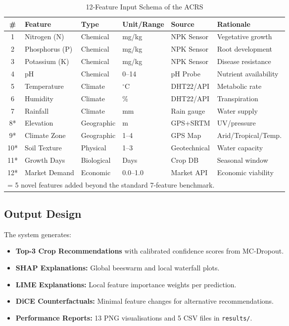 \documentclass[12pt,a4paper,oneside]{report}
\begin{document}
\begin{table}[H]
\centering
\caption{12-Feature Input Schema of the ACRS}
\label{tab:inputdesign}
\renewcommand{\arraystretch}{1.3}
\begin{tabular}{c p{2.5cm} p{1.8cm} p{2.0cm} p{2.2cm} p{2.8cm}}
\toprule
\textbf{\#} & \textbf{Feature} & \textbf{Type} & \textbf{Unit/Range} & \textbf{Source} & \textbf{Rationale} \\
\midrule
1 & Nitrogen (N) & Chemical & mg/kg & NPK Sensor & Vegetative growth \\
2 & Phosphorus (P) & Chemical & mg/kg & NPK Sensor & Root development \\
3 & Potassium (K) & Chemical & mg/kg & NPK Sensor & Disease resistance \\
4 & pH & Chemical & 0--14 & pH Probe & Nutrient availability \\
5 & Temperature & Climate & $^{\circ}$C & DHT22/API & Metabolic rate \\
6 & Humidity & Climate & \% & DHT22/API & Transpiration \\
7 & Rainfall & Climate & mm & Rain gauge & Water supply \\
8* & Elevation & Geographic & m & GPS+SRTM & UV/pressure \\
9* & Climate Zone & Geographic & 1--4 & GPS Map & Arid/Tropical/Temp. \\
10* & Soil Texture & Physical & 1--3 & Geotechnical & Water capacity \\
11* & Growth Days & Biological & Days & Crop DB & Seasonal window \\
12* & Market Demand & Economic & 0.0--1.0 & Market API & Economic viability \\
\bottomrule
\multicolumn{6}{l}{\small * = 5 novel features added beyond the standard 7-feature benchmark.}
\end{tabular}
\end{table}

\subsection{Output Design}
The system generates:
\begin{itemize}[leftmargin=*, label=$\bullet$]
  \item \textbf{Top-3 Crop Recommendations} with calibrated confidence scores from MC-Dropout.
  \item \textbf{SHAP Explanations:} Global beeswarm and local waterfall plots.
  \item \textbf{LIME Explanations:} Local feature importance weights per prediction.
  \item \textbf{DiCE Counterfactuals:} Minimal feature changes for alternative recommendations.
  \item \textbf{Performance Reports:} 13 PNG visualisations and 5 CSV files in \texttt{results/}.
\end{itemize}
\end{document}
